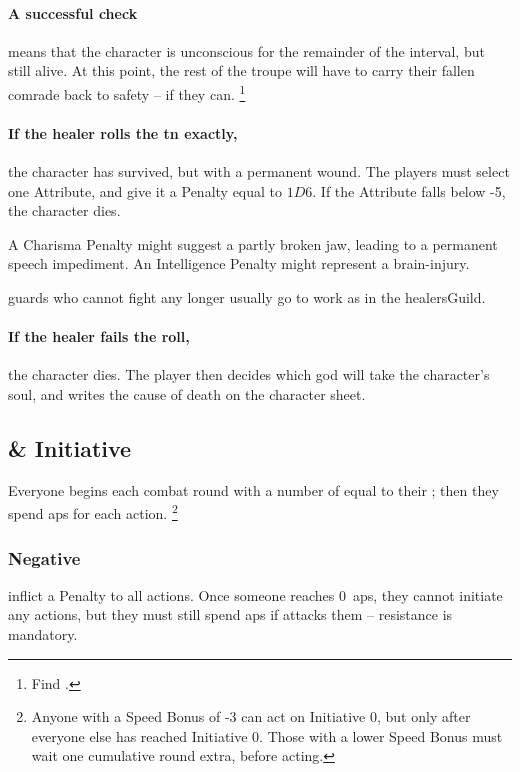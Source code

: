 \begin{multicols}{2}
\paragraph{A successful check}
means that the character is unconscious for the remainder of the \gls{interval}, but still alive.
At this point, the rest of the troupe will have to carry their fallen comrade back to safety -- if they can.%
\footnote{Find  .}

\paragraph{If the healer rolls the \gls{tn} exactly,}
the character has survived, but with a permanent wound.
The players must select one Attribute, and give it a Penalty equal to $1D6$.
If the Attribute falls below -5, the character dies.

A Charisma Penalty might suggest a partly broken jaw, leading to a permanent speech impediment.
An Intelligence Penalty might represent a brain-injury.

\Glspl{guard} who cannot fight any longer usually go to work as  in the \gls{healersGuild}.

\paragraph{If the healer fails the roll,}
the character dies.
The player then decides which god will take the character's soul, and writes the cause of death on the character sheet.

\subsection{ \& Initiative}
\label{actionPoints}

Everyone begins each \gls{combat} \gls{round} with a number of  equal to their ; then they spend \glspl{ap} for each action.%
\footnote{Anyone with a Speed Bonus of -3 can act on Initiative 0, but only after everyone else has reached Initiative 0.
Those with a lower Speed Bonus must wait one cumulative round extra, before acting.}

\subsubsection{Negative }
inflict a Penalty to all \glspl{action}.
Once someone reaches 0~\glspl{ap}, they cannot initiate any actions, but they must still spend \glspl{ap} if  attacks them -- resistance is mandatory.


\end{multicols}
